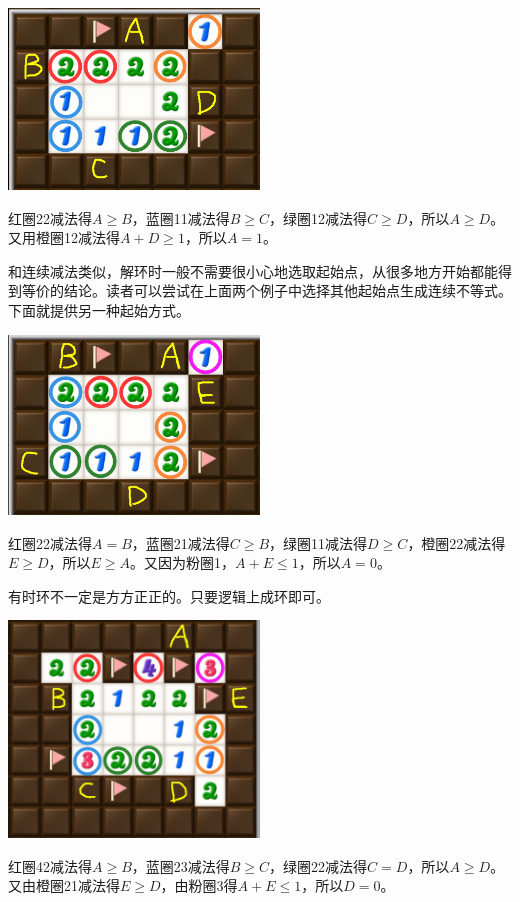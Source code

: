 \vspace{5mm}
\begin{center}
    \includegraphics[width=0.5\textwidth]{trick/环3.png}
\end{center}
红圈22减法得$A\ge B$，蓝圈11减法得$B\ge C$，绿圈12减法得$C\ge D$，所以$A\ge D$。又用橙圈12减法得$A+D\ge 1$，所以$A=1$。

和连续减法类似，解环时一般不需要很小心地选取起始点，从很多地方开始都能得到等价的结论。读者可以尝试在上面两个例子中选择其他起始点生成连续不等式。下面就提供另一种起始方式。

\vspace{5mm}
\begin{center}
    \includegraphics[width=0.5\textwidth]{trick/环4.png}
\end{center}
红圈22减法得$A=B$，蓝圈21减法得$C\ge B$，绿圈11减法得$D\ge C$，橙圈22减法得$E\ge D$，所以$E\ge A$。又因为粉圈1，$A+E\le 1$，所以$A=0$。

\vspace{5mm}
有时环不一定是方方正正的。只要逻辑上成环即可。

\vspace{5mm}
\begin{center}
    \includegraphics[width=0.5\textwidth]{trick/环5.png}
\end{center}
红圈42减法得$A\ge B$，蓝圈23减法得$B\ge C$，绿圈22减法得$C=D$，所以$A\ge D$。又由橙圈21减法得$E\ge D$，由粉圈3得$A+E\le 1$，所以$D=0$。

